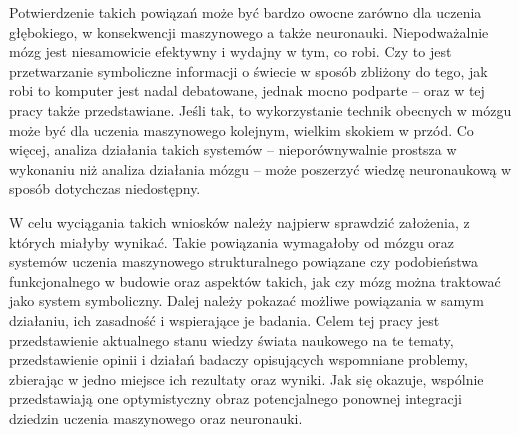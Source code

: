Potwierdzenie takich powiązań może być bardzo owocne zarówno dla uczenia głębokiego, w konsekwencji maszynowego a także neuronauki.
Niepodważalnie mózg jest niesamowicie efektywny i wydajny w tym, co robi.
Czy to jest przetwarzanie symboliczne informacji o świecie w sposób zbliżony do tego, jak robi to komputer jest nadal debatowane, jednak mocno podparte -- oraz w tej pracy także przedstawiane.
Jeśli tak, to wykorzystanie technik obecnych w mózgu może być dla uczenia maszynowego kolejnym, wielkim skokiem w przód.
Co więcej, analiza działania takich systemów -- nieporównywalnie prostsza w wykonaniu niż analiza działania mózgu -- może poszerzyć wiedzę neuronaukową w sposób dotychczas niedostępny.

W celu wyciągania takich wniosków należy najpierw sprawdzić założenia, z których miałyby wynikać.
Takie powiązania wymagałoby od mózgu oraz systemów uczenia maszynowego strukturalnego powiązane czy podobieństwa funkcjonalnego w budowie oraz aspektów takich, jak czy mózg można traktować jako system symboliczny.
Dalej należy pokazać możliwe powiązania w samym działaniu, ich zasadność i wspierające je badania.
Celem tej pracy jest przedstawienie aktualnego stanu wiedzy świata naukowego na te tematy, przedstawienie opinii i działań badaczy opisujących wspomniane problemy, zbierając w jedno miejsce ich rezultaty oraz wyniki.
Jak się okazuje, wspólnie przedstawiają one optymistyczny obraz potencjalnego ponownej integracji dziedzin uczenia maszynowego oraz neuronauki.
